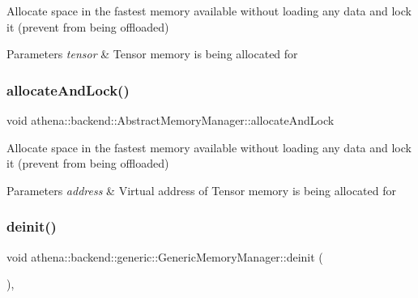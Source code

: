 Allocate space in the fastest memory available without loading any data and lock it (prevent from being offloaded) 
\begin{DoxyParams}{Parameters}
{\em tensor} & Tensor memory is being allocated for \\
\hline
\end{DoxyParams}
\mbox{\label{classathena_1_1backend_1_1generic_1_1_generic_memory_manager_ab5305b3d1ab91960bf179ce0be166120}} 
\subsubsection{\texorpdfstring{allocate\+And\+Lock()}{allocateAndLock()}\hspace{0.1cm}{\footnotesize\ttfamily [4/4]}}
{\footnotesize\ttfamily void athena\+::backend\+::\+Abstract\+Memory\+Manager\+::allocate\+And\+Lock}

Allocate space in the fastest memory available without loading any data and lock it (prevent from being offloaded) 
\begin{DoxyParams}{Parameters}
{\em address} & Virtual address of Tensor memory is being allocated for \\
\hline
\end{DoxyParams}
\mbox{\label{classathena_1_1backend_1_1generic_1_1_generic_memory_manager_ab90a8874618b851d5309cef66e79d08a}} 
\subsubsection{\texorpdfstring{deinit()}{deinit()}}
{\footnotesize\ttfamily void athena\+::backend\+::generic\+::\+Generic\+Memory\+Manager\+::deinit (\begin{DoxyParamCaption}{ }\end{DoxyParamCaption})\hspace{0.3cm}{\ttfamily [override]}, {\ttfamily [virtual]}}

